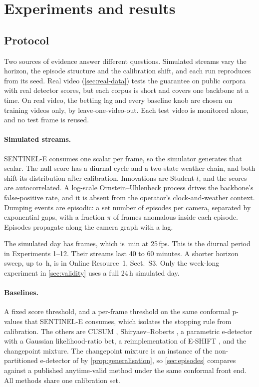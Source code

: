 \section{Experiments and results}
\label{sec:results}

\subsection{Protocol}
\label{sec:protocol}

Two sources of evidence answer different questions. Simulated streams vary the
horizon, the episode structure and the calibration shift, and each run
reproduces from its seed. Real video (\cref{sec:real-data}) tests the guarantee
on public corpora with real detector scores, but each corpus is short and
covers one backbone at a time. On real video, the betting lag and every
baseline knob are chosen on training videos only, by leave-one-video-out. Each
test video is monitored alone, and no test frame is reused.

\paragraph{Simulated streams.}
SENTINEL-E consumes one scalar per frame, so the simulator generates that
scalar. The null score has a diurnal cycle and a two-state weather chain, and
both shift its distribution after calibration. Innovations are Student-$t$, and
the scores are autocorrelated. A log-scale Ornstein--Uhlenbeck process drives
the backbone's false-positive rate, and it is absent from the operator's
clock-and-weather context. Dumping events are episodic: a set number of episodes
per camera, separated by exponential gaps, with a fraction $\pi$ of frames
anomalous inside each episode. Episodes propagate along the camera graph with a
lag.

The simulated day has \SimDiurnalFrames{} frames, which is \SimDiurnalMin{}\,min
at 25\,fps. This is the diurnal period in Experiments 1--12. Their streams last
40 to 60 minutes. A shorter horizon sweep, up to \HorizonMaxHours\,h, is in Online Resource~1,
Sect.~S3. Only the week-long experiment in \cref{sec:validity} uses a full
24\,h simulated day.

\paragraph{Baselines.}
A fixed score threshold, and a per-frame threshold on the same conformal p-values
that SENTINEL-E consumes, which isolates the stopping rule from calibration. The
others are CUSUM \citep{page1954}, Shiryaev--Roberts \citep{roberts1966}, a
parametric e-detector with a Gaussian likelihood-ratio bet, a reimplementation of
E-SHIFT \citep{khan2026eshift}, and the changepoint mixture. The changepoint
mixture is an instance of the non-partitioned e-detector of
\citet{saha2026nonpartitioned} by \cref{prop:generalisation}, so \cref{sec:episodes}
compares against a published anytime-valid method under the same conformal front
end. All methods share one calibration set.


